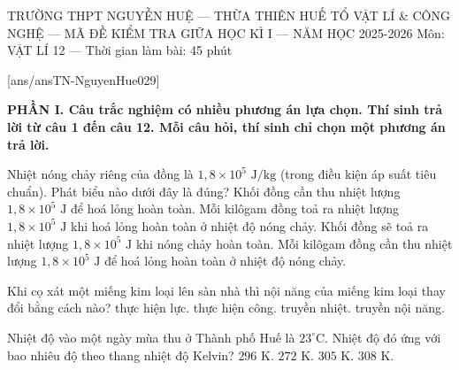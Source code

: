 

\def\toanlop{12}
\def\thoigian{45}
\def\namhoc{2025 - 2026}
\begin{dethi}
	{TRƯỜNG THPT NGUYỄN HUỆ --- THỪA THIÊN HUẾ}
	{TỔ VẬT LÍ \& CÔNG NGHỆ --- MÃ ĐỀ \thedeso}
	{KIỂM TRA GIỮA HỌC KÌ I --- NĂM HỌC 2025-2026}
	{Môn: VẬT LÍ 12 --- Thời gian làm bài: 45 phút}
\end{dethi}

[ans/ansTN-NguyenHue029]

\noindent \textbf{PHẦN I. Câu trắc nghiệm có nhiều phương án lựa chọn. Thí sinh trả lời từ câu 1 đến câu 12. Mỗi câu hỏi, thí sinh chỉ chọn một phương án trả lời.}
\vspace{0.2cm}

\begin{ex}%
	Nhiệt nóng chảy riêng của đồng là $1,8 \times 10^{5}\text{ J/kg}$ (trong điều kiện áp suất tiêu chuẩn). Phát biểu nào dưới đây là đúng?
	\choice
	{Khối đồng cần thu nhiệt lượng $1,8 \times 10^{5}\text{ J}$ để hoá lỏng hoàn toàn.}
	{Mỗi kilôgam đồng toả ra nhiệt lượng $1,8 \times 10^{5}\text{ J}$ khi hoá lỏng hoàn toàn ở nhiệt độ nóng chảy.}
	{Khối đồng sẽ toả ra nhiệt lượng $1,8 \times 10^{5}\text{ J}$ khi nóng chảy hoàn toàn.}
	{\True Mỗi kilôgam đồng cần thu nhiệt lượng $1,8 \times 10^{5}\text{ J}$ để hoá lỏng hoàn toàn ở nhiệt độ nóng chảy.}
\end{ex}

\begin{ex}%
	Khi cọ xát một miếng kim loại lên sàn nhà thì nội năng của miếng kim loại thay đổi bằng cách nào?
	\choice
	{thực hiện lực.}
	{\True thực hiện công.}
	{truyền nhiệt.}
	{truyền nội năng.}
\end{ex}

\begin{ex}%
	Nhiệt độ vào một ngày mùa thu ở Thành phố Huế là $23^\circ\text{C}$. Nhiệt độ đó ứng với bao nhiêu độ theo thang nhiệt độ Kelvin?
	\choice
	{\True $296\text{ K}$.}
	{$272\text{ K}$.}
	{$305\text{ K}$.}
	{$308\text{ K}$.}
\end{ex}

